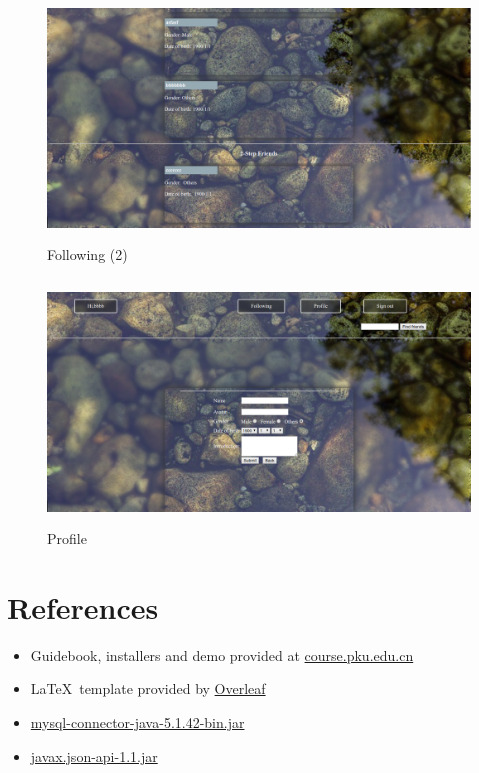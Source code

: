 \begin{figure}[!htbp]
	\begin{center}
		\includegraphics[width=12cm,height=6.5cm]{p4.png}
		\caption{Following (2)}
	\end{center}
\end{figure}
\begin{figure}[!htbp]
	\begin{center}
		\includegraphics[width=12cm,height=6.5cm]{p5.png}
		\caption{Profile}
	\end{center}
\end{figure}

\section{References}

\begin{itemize}
	\item Guidebook, installers and demo provided at \url{course.pku.edu.cn}
	\item \LaTeX \, template provided by \href{https://www.overleaf.com/latex/templates/project-template-titlepage/bwmhgfdvvhpw}{Overleaf}
	\item \href{https://dev.mysql.com/downloads/connector/j/}{mysql-connector-java-5.1.42-bin.jar}
	\item \href{https://mvnrepository.com/artifact/javax.json/javax.json-api/1.1}{javax.json-api-1.1.jar}
\end{itemize}


